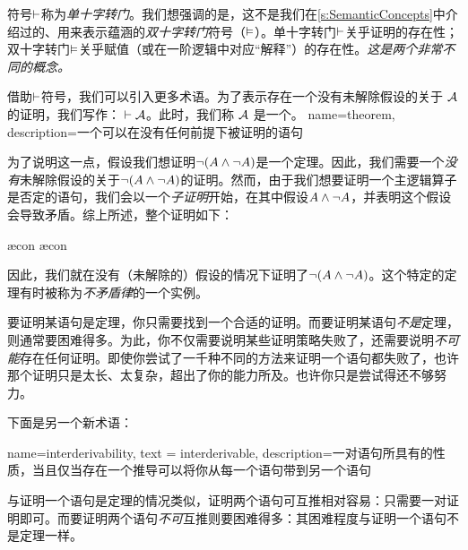 符号$\vdash$称为\emph{单十字转门}。我们想强调的是，这不是我们在\cref{s:SemanticConcepts}中介绍过的、用来表示蕴涵的\emph{双十字转门}符号（$\vDash$）。单十字转门$\vdash$关乎证明的存在性；双十字转门$\vDash$关乎赋值（或在一阶逻辑中对应“解释”）的存在性。\emph{这是两个非常不同的概念。}

借助$\vdash$符号，我们可以引入更多术语。为了表示存在一个没有未解除假设的关于 $\mathcal{A}$ 的证明，我们写作：${} \vdash \mathcal{A}$。此时，我们称 $\mathcal{A}$ 是一个。
{
name=theorem,
description={一个可以在没有任何前提下被证明的语句}
}

为了说明这一点，假设我们想证明$\neg (A \wedge \neg A)$是一个定理。因此，我们需要一个\emph{没有}未解除假设的关于$\neg(A \wedge \neg A)$的证明。然而，由于我们想要证明一个主逻辑算子是否定的语句，我们会以一个\emph{子证明}开始，在其中假设$A \wedge \neg A$，并表明这个假设会导致矛盾。综上所述，整个证明如下：


\begin{fitchproof}
		\open
			\AS
			\ae{con}
			\ae{con}
		\close
	\end{fitchproof}


因此，我们就在没有（未解除的）假设的情况下证明了$\neg (A \wedge \neg A)$。这个特定的定理有时被称为\emph{不矛盾律}的一个实例。

要证明某语句是定理，你只需要找到一个合适的证明。而要证明某语句\emph{不是}定理，则通常要困难得多。为此，你不仅需要说明某些证明策略失败了，还需要说明\emph{不可能}存在任何证明。即使你尝试了一千种不同的方法来证明一个语句都失败了，也许那个证明只是太长、太复杂，超出了你的能力所及。也许你只是尝试得还不够努力。

下面是另一个新术语：

{
  name=interderivability,
  text = interderivable,
description={一对语句所具有的性质，当且仅当存在一个推导可以将你从每一个语句带到另一个语句}
}

与证明一个语句是定理的情况类似，证明两个语句可互推相对容易：只需要一对证明即可。而要证明两个语句\emph{不可}互推则要困难得多：其困难程度与证明一个语句不是定理一样。


